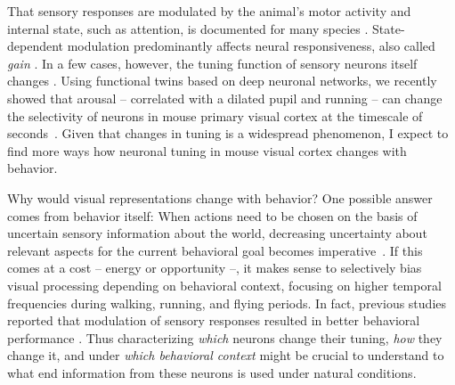 \documentclass[COG,11pt]{ercgrant}
\begin{document}
That sensory responses are modulated by the animal's motor activity and internal state, such as attention, is documented for many species \parencite{Rowell1971-zj, Wiersma1968-xt, Maimon2010-sa, Niell2010-bs,Bezdudnaya2006-ge, Treue1996-lp, Musall2019-kd}.
State-dependent modulation predominantly affects neural responsiveness, also called \textit{gain} \parencite{Eggermann2014-xp, Niell2010-bs, McAdams1999-cs,Schroder2020-jl, Dadarlat2017-jw, Mineault2016-fk}. 
In a few cases, however, the tuning function of sensory neurons itself changes \parencite{Chiappe2010-bm, Bezdudnaya2006-ge, Andermann2011-vw, Treue1996-lp}. 
Using functional twins based on deep neuronal networks, we recently showed that arousal -- correlated with a dilated pupil and running -- can change the selectivity of neurons in mouse primary visual cortex at the timescale of seconds~\parencite{Franke2022-do}. 
Given that changes in tuning is a widespread phenomenon, I expect to find more ways how neuronal tuning in mouse visual cortex changes with behavior. 

Why would visual representations change with behavior? 
One possible answer comes from behavior itself:
When actions need to be chosen on the basis of uncertain sensory information about the world, decreasing uncertainty about relevant aspects for the current behavioral goal becomes imperative~\parencite{Chebolu2022-tb}. 
If this comes at a cost -- energy or opportunity --, it makes sense to selectively bias visual processing depending on behavioral context, \eg focusing on  higher temporal frequencies during walking, running, and flying periods.
In fact, previous studies reported that modulation of sensory responses resulted in better behavioral performance \parencite{Spitzer1988-kq, Bennett2013-rk, Dadarlat2017-jw, De_Gee2022-ir}.
Thus characterizing \textit{which} neurons change their tuning, \textit{how} they change it, and under \textit{which behavioral context} might be crucial to understand to what end information from these neurons is used under natural conditions.
\end{document}
